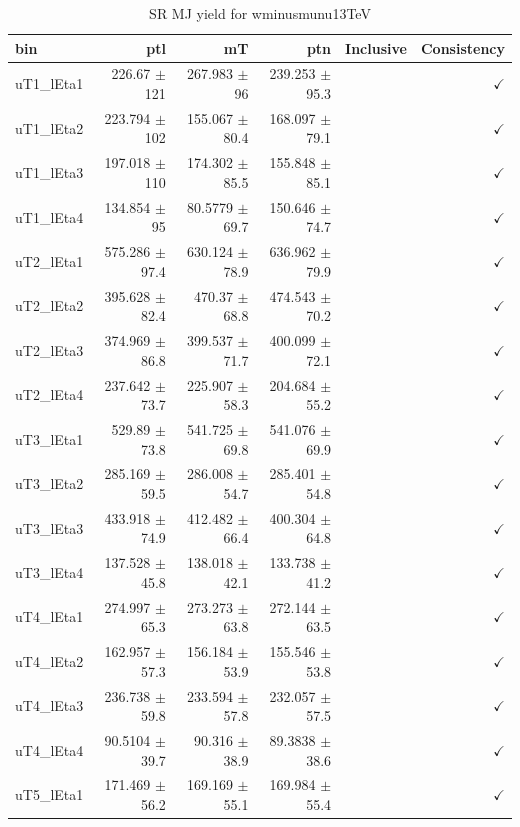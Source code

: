 \begin{table}[htbp]
\centering
\scriptsize
\caption{SR MJ yield for wminusmunu13TeV}
\label{tab:wminusmunu13TeV}
\setlength{\tabcolsep}{6pt}
\begin{tabular}{lrrrrr}
\hline
bin & ptl & mT & ptn & Inclusive & Consistency \\
\hline
uT1\_lEta1 & 226.67 $\pm$ 121 & 267.983 $\pm$ 96 & 239.253 $\pm$ 95.3 &  & $\checkmark$ \\
uT1\_lEta2 & 223.794 $\pm$ 102 & 155.067 $\pm$ 80.4 & 168.097 $\pm$ 79.1 &  & $\checkmark$ \\
uT1\_lEta3 & 197.018 $\pm$ 110 & 174.302 $\pm$ 85.5 & 155.848 $\pm$ 85.1 &  & $\checkmark$ \\
uT1\_lEta4 & 134.854 $\pm$ 95 & 80.5779 $\pm$ 69.7 & 150.646 $\pm$ 74.7 &  & $\checkmark$ \\
uT2\_lEta1 & 575.286 $\pm$ 97.4 & 630.124 $\pm$ 78.9 & 636.962 $\pm$ 79.9 &  & $\checkmark$ \\
uT2\_lEta2 & 395.628 $\pm$ 82.4 & 470.37 $\pm$ 68.8 & 474.543 $\pm$ 70.2 &  & $\checkmark$ \\
uT2\_lEta3 & 374.969 $\pm$ 86.8 & 399.537 $\pm$ 71.7 & 400.099 $\pm$ 72.1 &  & $\checkmark$ \\
uT2\_lEta4 & 237.642 $\pm$ 73.7 & 225.907 $\pm$ 58.3 & 204.684 $\pm$ 55.2 &  & $\checkmark$ \\
uT3\_lEta1 & 529.89 $\pm$ 73.8 & 541.725 $\pm$ 69.8 & 541.076 $\pm$ 69.9 &  & $\checkmark$ \\
uT3\_lEta2 & 285.169 $\pm$ 59.5 & 286.008 $\pm$ 54.7 & 285.401 $\pm$ 54.8 &  & $\checkmark$ \\
uT3\_lEta3 & 433.918 $\pm$ 74.9 & 412.482 $\pm$ 66.4 & 400.304 $\pm$ 64.8 &  & $\checkmark$ \\
uT3\_lEta4 & 137.528 $\pm$ 45.8 & 138.018 $\pm$ 42.1 & 133.738 $\pm$ 41.2 &  & $\checkmark$ \\
uT4\_lEta1 & 274.997 $\pm$ 65.3 & 273.273 $\pm$ 63.8 & 272.144 $\pm$ 63.5 &  & $\checkmark$ \\
uT4\_lEta2 & 162.957 $\pm$ 57.3 & 156.184 $\pm$ 53.9 & 155.546 $\pm$ 53.8 &  & $\checkmark$ \\
uT4\_lEta3 & 236.738 $\pm$ 59.8 & 233.594 $\pm$ 57.8 & 232.057 $\pm$ 57.5 &  & $\checkmark$ \\
uT4\_lEta4 & 90.5104 $\pm$ 39.7 & 90.316 $\pm$ 38.9 & 89.3838 $\pm$ 38.6 &  & $\checkmark$ \\
uT5\_lEta1 & 171.469 $\pm$ 56.2 & 169.169 $\pm$ 55.1 & 169.984 $\pm$ 55.4 &  & $\checkmark$ \\

\end{tabular}
\end{table}
